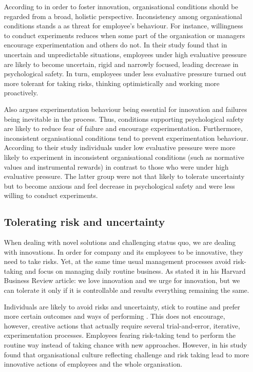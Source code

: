 According to \citet{lee2004mixed} in order to foster innovation, organisational conditions should be regarded from a broad, holistic perspective. Inconsistency among organisational conditions stands a as threat for employee's behaviour. For instance, willingness to conduct experiments reduces when some part of the organisation or managers encourage experimentation and others do not. In their study \citet{lee2004mixed} found that in uncertain and unpredictable situations, employees under high evaluative pressure are likely to become uncertain, rigid and narrowly focused, leading decrease in psychological safety. In turn, employees under less evaluative pressure turned out more tolerant for taking risks, thinking optimistically and working more proactively. 

Also \citet{lee2004mixed} argues experimentation behaviour being essential for innovation and failures being inevitable in the process. Thus, conditions supporting psychological safety are likely to reduce fear of failure and encourage experimentation. Furthermore, inconsistent organisational conditions tend to prevent experimentation behaviour. According to their study \citet{lee2004mixed} individuals under low evaluative pressure were more likely to experiment in inconsistent organisational conditions (such as normative values and instrumental rewards) in contrast to those who were under high evaluative pressure. The latter group were not that likely to tolerate uncertainty but to become anxious and feel decrease in psychological safety and were less willing to conduct experiments. 

\subsection{Tolerating risk and uncertainty}
When dealing with novel solutions and challenging status quo, we are dealing with innovations. In order for company and its employees to be innovative, they need to take risks. Yet, at the same time usual management processes avoid risk-taking and focus on managing daily routine business. As \citet{quinn1985managing} stated it in his Harvard Business Review article: we love innovation and we urge for innovation, but we can tolerate it only if it is controllable and results everything remaining the same. \citep{quinn1985managing}

Individuals are likely to avoid risks and uncertainty, stick to routine and prefer more certain outcomes and ways of performing \citep{bazerman2012judgment}. This does not encourage, however, creative actions that actually require several trial-and-error, iterative, experimentation processes. Employees fearing risk-taking tend to perform the routine way instead of taking chance with new approaches. \citep{shalley2004leaders} However, in his study \citet{nystrom1990organizational} found that organisational culture reflecting challenge and risk taking lead to more innovative actions of employees and the whole organisation. 

